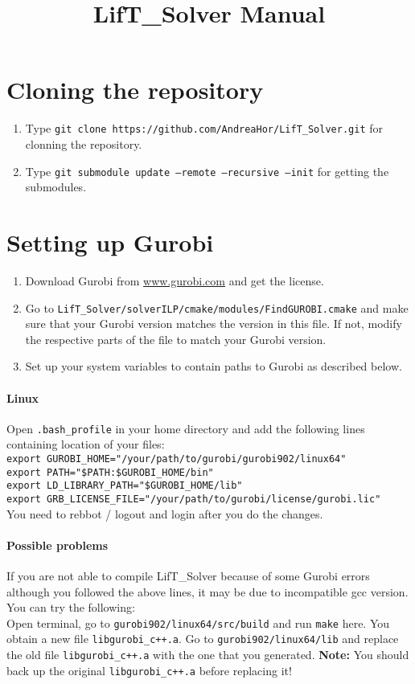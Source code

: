 \documentclass[a4paper,10pt]{article}
\title{LifT\_Solver Manual}
\author{}
\begin{document}
\maketitle



\section{Cloning the repository}
\begin{enumerate}
 \item Type \texttt{git clone https://github.com/AndreaHor/LifT\_Solver.git} for clonning the repository.
 \item Type \texttt{git submodule update --remote --recursive --init} for  getting the submodules.
 \end{enumerate}
\section{Setting up Gurobi}

\begin{enumerate}
 \item Download Gurobi from \url{www.gurobi.com} and get the license. 
 \item Go to \texttt{LifT\_Solver/solverILP/cmake/modules/FindGUROBI.cmake} and make sure that your Gurobi version matches the version in this file. If not, modify the respective parts of the file to match your Gurobi version. 
 \item Set up your system variables to contain paths to Gurobi as described below.
 \end{enumerate}
 \paragraph{Linux}
Open \texttt{.bash\_profile} in your home directory and add the following lines containing location of your files:\\
\texttt{export GUROBI\_HOME="/your/path/to/gurobi/gurobi902/linux64"\\
export PATH="\${PATH}:\${GUROBI\_HOME}/bin"\\
export LD\_LIBRARY\_PATH="\${GUROBI\_HOME}/lib"\\ 
export GRB\_LICENSE\_FILE="/your/path/to/gurobi/license/gurobi.lic" }\\
You need to rebbot / logout and login after you do the changes.
 
\paragraph{Possible problems} If you are not able to compile LifT\_Solver because of some Gurobi errors although you followed the above lines, it may be due to incompatible gcc version. You can try the following:\\
Open terminal, go to \texttt{gurobi902/linux64/src/build} and run \texttt{make} here. You obtain a new file \texttt{libgurobi\_c++.a}. Go to \texttt{gurobi902/linux64/lib} and replace the old file \texttt{libgurobi\_c++.a} with the one that you generated. \textbf{Note:} You should back up the original \texttt{libgurobi\_c++.a} before replacing it!
\end{document}

